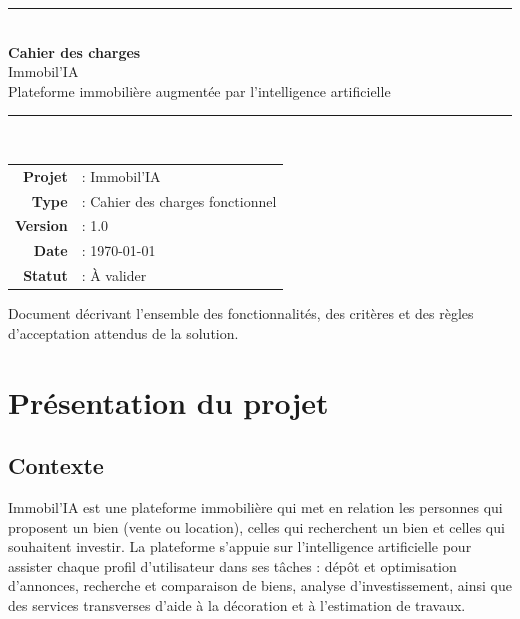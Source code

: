 \documentclass[11pt,a4paper]{article}
\begin{document}
\begin{titlepage}
\centering
\vspace*{2.2cm}

{\color{primary}\rule{\textwidth}{2pt}}\\[0.5cm]
{\Huge\bfseries\color{primary} Cahier des charges}\\[0.35cm]
{\LARGE\color{secondary} Immobil'IA}\\[0.35cm]
{\large\color{greytext} Plateforme immobilière augmentée par l'intelligence artificielle}\\[0.3cm]
{\color{primary}\rule{\textwidth}{2pt}}\\[2cm]

\begin{tabular}{rl}
\textbf{Projet}  & : Immobil'IA \\[4pt]
\textbf{Type}    & : Cahier des charges fonctionnel \\[4pt]
\textbf{Version} & : 1.0 \\[4pt]
\textbf{Date}    & : \today \\[4pt]
\textbf{Statut}  & : À valider \\
\end{tabular}

\vfill
{\small\color{greytext} Document décrivant l'ensemble des fonctionnalités,
des critères et des règles d'acceptation attendus de la solution.}
\end{titlepage}

\tableofcontents
\thispagestyle{fancy}
\clearpage

\section{Présentation du projet}

\subsection{Contexte}
Immobil'IA est une plateforme immobilière qui met en relation les personnes
qui proposent un bien (vente ou location), celles qui recherchent un bien et
celles qui souhaitent investir. La plateforme s'appuie sur l'intelligence
artificielle pour assister chaque profil d'utilisateur dans ses tâches :
dépôt et optimisation d'annonces, recherche et comparaison de biens, analyse
d'investissement, ainsi que des services transverses d'aide à la décoration
et à l'estimation de travaux.
\end{document}
